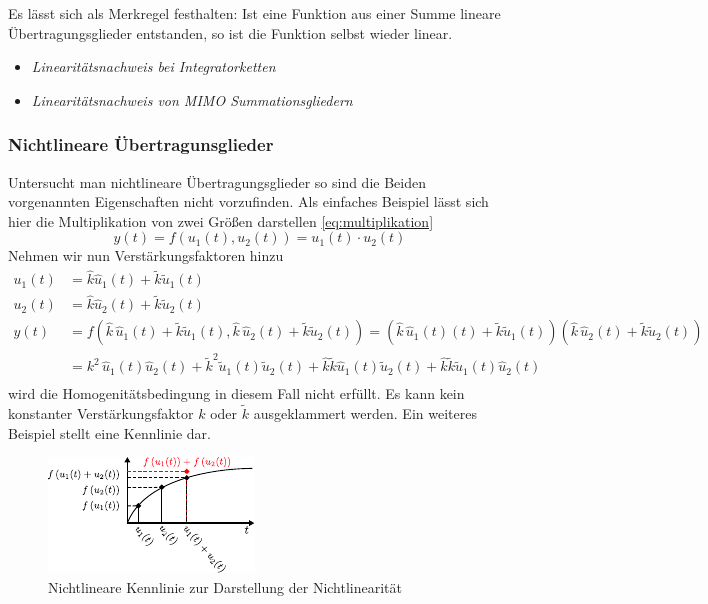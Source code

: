 %
Es lässt sich als Merkregel festhalten: Ist eine Funktion aus einer Summe lineare Übertragungsglieder entstanden, so ist die Funktion selbst wieder linear. 
%
\begin{Aufgaben}{}{}
	\begin{itemize}
		\item \textit{Linearitätsnachweis bei Integratorketten}
		\item \textit{Linearitätsnachweis von MIMO Summationsgliedern}
	\end{itemize}
\end{Aufgaben}
%
\subsubsection{Nichtlineare Übertragunsglieder}
%
Untersucht man nichtlineare Übertragungsglieder so sind die Beiden vorgenannten Eigenschaften nicht vorzufinden. Als einfaches Beispiel lässt sich hier die Multiplikation von zwei Größen darstellen \eqref{eq:multiplikation}
%
\begin{equation}
y(t) = f\left(u_{1}(t),u_{2}(t)\right)=u_{1}(t)\cdot u_{2}(t) \label{eq:multiplikation}
\end{equation}
%
Nehmen wir nun Verstärkungsfaktoren hinzu
%
%
\begin{equation*}
\begin{aligned}
u_{1}(t)&=\hat{k}\hat{u}_{1}(t)+\tilde{k}\tilde{u}_{1}(t)\\
u_{2}(t)&=\hat{k}\hat{u}_{2}(t)+\tilde{k}\tilde{u}_{2}(t)\\
y(t)&=f\left(\hat{k}\,\hat{u}_{1}(t)+\tilde{k}\tilde{u}_{1}(t),\hat{k}\,\hat{u}_{2}(t)+\tilde{k}\tilde{u}_{2}(t)\right)=\left(\hat{k}\,\hat{u}_{1}(t)(t)+\tilde{k}\tilde{u}_{1}(t)\right)\left(\hat{k}\,\hat{u}_{2}(t)+\tilde{k}\tilde{u}_{2}(t)\right)\\
	&= k^{2}\,\hat{u}_{1}(t)\hat{u}_{2}(t)+\tilde{k}^{2}\tilde{u}_{1}(t)\tilde{u}_{2}(t)+\hat{k}\tilde{k}\hat{u}_{1}(t)\tilde{u}_{2}(t)+\hat{k}\tilde{k}\tilde{u}_{1}(t)\hat{u}_{2}(t)\\
\end{aligned}
\end{equation*}
%
wird die Homogenitätsbedingung in diesem Fall nicht erfüllt. Es kann kein konstanter Verstärkungsfaktor $k$ oder $\tilde{k}$ ausgeklammert werden. Ein weiteres Beispiel stellt eine Kennlinie dar. 
%
\begin{figure}[h]
	\centering
	\includegraphics[width=0.6\linewidth]{Abbildungen/Modellbildung/PDF/NichtlinKurve.pdf}
	\caption{Nichtlineare Kennlinie zur Darstellung der Nichtlinearität}
	\label{fig:nichtlinkurve}
\end{figure}
